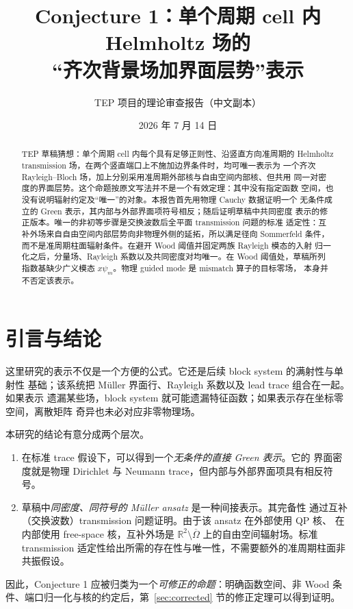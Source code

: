 \documentclass[UTF8,11pt,fontset=fandol]{ctexart}
\title{Conjecture 1：单个周期 cell 内 Helmholtz 场的\\“齐次背景场加界面层势”表示}
\author{TEP 项目的理论审查报告（中文副本）}
\date{2026 年 7 月 14 日}
\newcommand{\Om}{\Omega}
\newcommand{\R}{\mathbb R}
\theoremstyle{plain}
\theoremstyle{definition}
\theoremstyle{remark}
\begin{document}
\maketitle

\begin{abstract}
TEP 草稿猜想：单个周期 cell 内每个具有足够正则性、沿竖直方向准周期的
Helmholtz transmission 场，在两个竖直端口上不施加边界条件时，均可唯一表示为
一个齐次 Rayleigh--Bloch 场，加上分别采用准周期外部核与自由空间内部核、但共用
同一对密度的界面层势。这个命题按原文写法并不是一个有效定理：其中没有指定函数
空间，也没有说明辐射约定及“唯一”的对象。本报告首先用物理 Cauchy 数据证明一个
无条件成立的 Green 表示，其内部与外部界面项符号相反；随后证明草稿中共同密度
表示的修正版本。唯一的非初等步骤是交换波数后全平面 transmission 问题的标准
适定性：互补外场来自自由空间内部层势向非物理外侧的延拓，所以满足径向 Sommerfeld
条件，而不是准周期柱面辐射条件。在避开 Wood 阈值并固定两族 Rayleigh 模态的入射
归一化之后，分量场、Rayleigh 系数以及共同密度对均唯一。在 Wood 阈值处，草稿所列
指数基缺少广义模态 \(x\psi_m\)。物理 guided mode 是 mismatch 算子的目标零场，
本身并不否定该表示。
\end{abstract}

\tableofcontents

\section{引言与结论}

这里研究的表示不仅是一个方便的公式。它还是后续 block system 的满射性与单射性
基础；该系统把 Müller 界面行、Rayleigh 系数以及 lead trace 组合在一起。如果表示
遗漏某些场，block system 就可能遗漏特征函数；如果表示存在坐标零空间，离散矩阵
奇异也未必对应非零物理场。

本研究的结论有意分成两个层次。

\begin{enumerate}
\item 在标准 trace 假设下，可以得到一个\emph{无条件的直接 Green 表示}。它的
界面密度就是物理 Dirichlet 与 Neumann trace，但内部与外部界面项具有相反符号。
\item 草稿中\emph{同密度、同符号的 Müller ansatz} 是一种间接表示。其完备性
通过互补（交换波数）transmission 问题证明。由于该 ansatz 在外部使用 QP 核、
在内部使用 free-space 核，互补外场是
\(\R^2\setminus\overline\Om\) 上的自由空间辐射场。标准 transmission
适定性给出所需的存在性与唯一性，不需要额外的准周期柱面非共振假设。
\end{enumerate}

因此，Conjecture 1 应被归类为一个\emph{可修正的命题}：明确函数空间、非 Wood
条件、端口归一化与核的约定后，第~\ref{sec:corrected} 节的修正定理可以得到证明。
\end{document}
